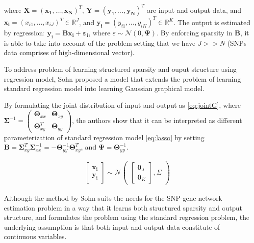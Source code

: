 \documentclass{article}
\begin{document}
where $\mathbf{X}=(\mathbf{x_1}, ... ,\mathbf{x_N})^T$, $\mathbf{Y}=(\mathbf{y_1}, ... ,\mathbf{y_N})^T$ are input and output data, and $\mathbf{x_i}=(x_{i1}, ... ,x_{iJ})^T \in \mathbb{R}^J$, and $\mathbf{y_i}=(y_{i1}, ... ,y_{iK})^T \in \mathbb{R}^K$.
The output is estimated by regression: $\mathbf{y_i}=\mathbf{Bx_i}+\mathbf{\varepsilon_i}$, where $\varepsilon  \sim \mathcal{N}(0, \mathbf{\Psi})$.
By enforcing sparsity in \textbf{B}, it is able to take into account of the problem setting that we have $J >> N$ (SNPs data comprises of high-dimensional vector).

To address problem of learning structured sparsity and ouput structure using regression model, Sohn \cite{sohn2012joint} proposed a model that extends the problem of learning standard regression model into learning Gaussian graphical model.

By formulating the joint distribution of input and output as \ref{eq:jointG}, where $ \mathbf{\Sigma}^{-1}= \begin{pmatrix}
    \mathbf{\Theta}_{xx} & \mathbf{\Theta}_{xy}\\
   \mathbf{\Theta}_{xy}^T &  \mathbf{\Theta}_{yy}  
\end{pmatrix}$,
the authors show that it can be interpreted as different parameterization of standard regression model \ref{eq:lasso} by setting $\mathbf{B}=\mathbf{\Sigma}_{xy}^T \mathbf{\Sigma}_{xx}^{-1}=-\mathbf{\Theta}_{yy}^{-1}\mathbf{\Theta}_{xy}^T$, and $\mathbf{\Psi}= \mathbf{\Theta}_{yy}^{-1}$.



\begin{align}\label{eq:jointG}
\begin{bmatrix}
    \mathbf{x_i}\\
    \mathbf{y_i}
\end{bmatrix}
 \sim \mathcal{N}
 \begin{pmatrix}
\begin{bmatrix}
    \mathbf{0}_J  \\
   \mathbf{0}_K
\end{bmatrix}
,
    \Sigma
\end{pmatrix}
\end{align}

Although the method by Sohn suits the needs for the SNP-gene network estimation problem in a way that it learns both structured sparsity and output structure, and formulates the problem using the standard regression problem, the underlying assumption is that both input and output data constitute of continuous variables. 
\end{document}
